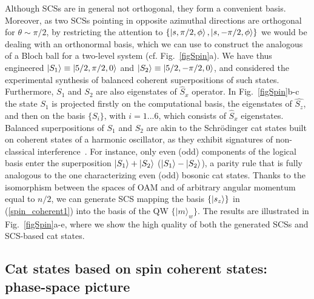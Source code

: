 Although SCSs are in general not orthogonal, they form a convenient basis. Moreover, as two SCSs pointing in opposite azimuthal directions are orthogonal for $\theta\sim\pi/2$, by restricting the attention to $\{\ket{s,\pi/2,\phi},\ket{s,-\pi/2,\phi}\}$ we would be dealing with an orthonormal basis, which we can use to construct the analogous of a Bloch ball for a two-level system (cf. Fig.~\ref{figSpin}a). We have thus engineered $\ket{S_1}\equiv\ket{5/2,\pi/2,0}$ and $\ket{S_2}\equiv\ket{5/2,-\pi/2,0}$, and considered the experimental synthesis of balanced coherent superpositions of such states.
Furthermore, $S_1$ and $S_2$ are also eigenstates of $\hat{S}_x$ operator. In Fig.~\ref{figSpin}b-c the state $S_1$ is projected firstly on the computational basis, the eigenstates of $\hat{S_z}$, and then on the basis $\{S_i\}$, with $i=1...6$, which consists of $\hat{S}_x$ eigenstates. Balanced superpositions of $S_1$ and $S_2$ are akin to the Schr\"odinger cat states built on coherent states of a harmonic oscillator, as they exhibit signatures of non-classical interference~\cite{agarwal1997atomic,SI}. For instance, only even (odd) components of the logical basis enter the superposition $\ket{S_1}+\ket{S_2}$ ($\ket{S_1}-\ket{S_2}$), a parity rule that is fully analogous to the one characterizing even (odd) bosonic cat states. Thanks to the isomorphism between the spaces of OAM and of arbitrary angular momentum equal to $n/2$, we can generate SCS mapping the basis $\{ \ket{s_z}\}$ in (\ref{spin_coherent1}) into the basis of the \ac{QW} $\{|m\rangle_w\}$. The results are illustrated in Fig.~\ref{figSpin}a-e, where we show the high quality of both the generated SCSs and SCS-based cat states. %

\subsection{Cat states based on spin coherent states: phase-space picture}

